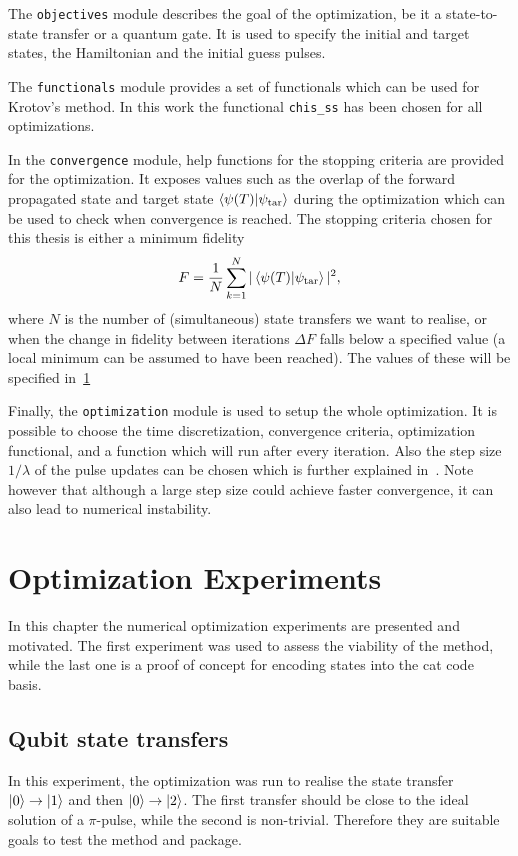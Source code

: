 \documentclass[main.tex]{subfiles}
\begin{document}
The \texttt{objectives} module describes the goal of the optimization, be it a state-to-state transfer or a quantum gate.
It is used to specify the initial and target states, the Hamiltonian and the initial guess pulses.

The \texttt{functionals} module provides a set of functionals which can be used for Krotov's method.
In this work the functional \texttt{chis\_ss} has been chosen for all optimizations.

In the \texttt{convergence} module, help functions for the stopping criteria are provided for the optimization.
It exposes values such as the overlap of the forward propagated state and target state \(\braket{\psi(T)}{\psi_{\text{tar}}}\) during the optimization which can be used to check when convergence is reached.
The stopping criteria chosen for this thesis is either a minimum fidelity
\begin{equation}
    F = \frac{1}{N}\sum_{k=1}^{N} |\braket{\psi(T)}{\psi_{\text{tar}}}|^2,
\end{equation}
where \(N\) is the number of (simultaneous) state transfers we want to realise, or when the change in fidelity between iterations \(\Delta F\) falls below a specified value (a local minimum can be assumed to have been reached).
The values of these will be specified in~\cref{sec:optimization-experiments}

Finally, the \texttt{optimization} module is used to setup the whole optimization.
It is possible to choose the time discretization, convergence criteria, optimization functional, and a function which will run after every iteration.
Also the step size \(1/\lambda\) of the pulse updates can be chosen which is further explained in~\cite{goerz_krotov:_2019}.
Note however that although a large step size could achieve faster convergence, it can also lead to numerical instability.

\section{Optimization Experiments}
\label{sec:optimization-experiments}
In this chapter the numerical optimization experiments are presented and motivated.
The first experiment was used to assess the viability of the method, while the last one is a proof of concept for encoding states into the cat code basis.

\subsection{Qubit state transfers}
In this experiment, the optimization was run to realise the state transfer \(\ket{0}\rightarrow\ket{1}\) and then \(\ket{0}\rightarrow\ket{2}\).
The first transfer should be close to the ideal solution of a \(\pi\)-pulse, while the second is non-trivial.
Therefore they are suitable goals to test the method and package.
\end{document}
